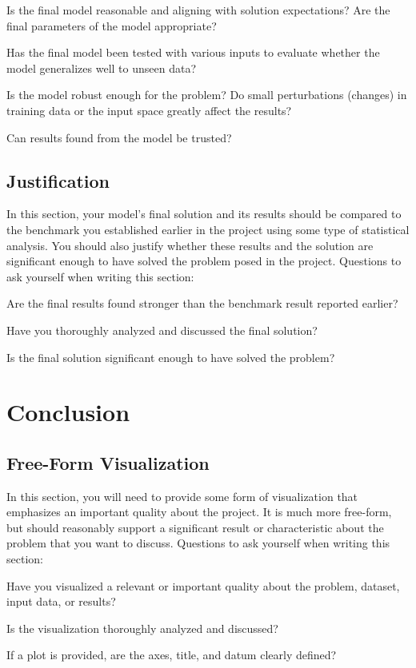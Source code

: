 \documentclass[12pt,journal,compsoc]{IEEEtran}
\begin{document}
Is the final model reasonable and aligning with solution expectations? Are the final parameters of the model appropriate?

Has the final model been tested with various inputs to evaluate whether the model generalizes well to unseen data?

Is the model robust enough for the problem? Do small perturbations (changes) in training data or the input space greatly affect the results?

Can results found from the model be trusted?


\subsection{Justification}
In this section, your model’s final solution and its results should be compared to the benchmark you established earlier in the project using some type of statistical analysis. You should also justify whether these results and the solution are significant enough to have solved the problem posed in the project. Questions to ask yourself when writing this section:

Are the final results found stronger than the benchmark result reported earlier?

Have you thoroughly analyzed and discussed the final solution?

Is the final solution significant enough to have solved the problem?


\section{Conclusion} %
\subsection{Free-Form Visualization}
In this section, you will need to provide some form of visualization that emphasizes an important quality about the project. It is much more free-form, but should reasonably support a significant result or characteristic about the problem that you want to discuss. Questions to ask yourself when writing this section:

Have you visualized a relevant or important quality about the problem, dataset, input data, or results?

Is the visualization thoroughly analyzed and discussed?

If a plot is provided, are the axes, title, and datum clearly defined?
\end{document}
